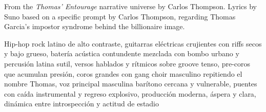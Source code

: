 
\begin{notes}
From the \emph{Thomas' Entourage} narrative universe by Carlos Thompson. Lyrics by Suno based on a specific prompt by Carlos Thompson, regarding Thomas Garcia's impostor syndrome behind the billionaire image.
\end{notes}
\begin{style}
Hip-hop rock latino de alto contraste, guitarras eléctricas crujientes con riffs secos y bajo grueso, batería acústica contundente mezclada con bombo urbano y percusión latina sutil, versos hablados y rítmicos sobre groove tenso, pre-coros que acumulan presión, coros grandes con gang choir masculino repitiendo el nombre Thomas, voz principal masculina barítono cercana y vulnerable, puentes con caída instrumental y regreso explosivo, producción moderna, áspera y clara, dinámica entre introspección y actitud de estadio
\end{style}
